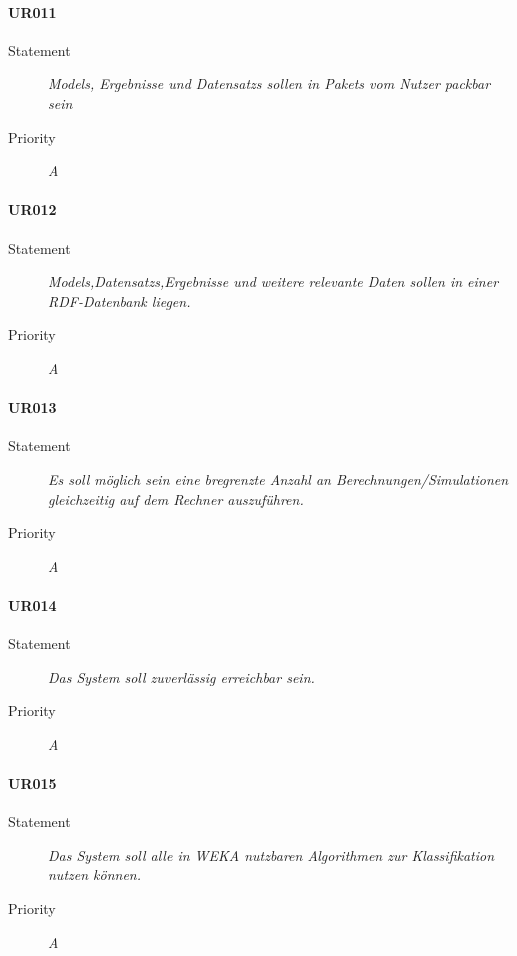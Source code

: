 \paragraph{UR011}
\begin{description}
\item[Statement] \textit{\glspl{Model}, Ergebnisse und \glspl{Datensatz} sollen in \glspl{Paket} vom Nutzer packbar sein}%
\item[Priority] \textit{A}
\end{description}

\paragraph{UR012}
\begin{description}
\item[Statement] \textit{\glspl{Model},\glspl{Datensatz},Ergebnisse und weitere relevante Daten sollen in einer \gls{RDF}-Datenbank liegen.}%
\item[Priority] \textit{A}
\end{description}

\paragraph{UR013}
\begin{description}
\item[Statement] \textit{Es soll möglich sein eine bregrenzte Anzahl an Berechnungen/Simulationen gleichzeitig auf dem Rechner auszuführen.} %
\item[Priority] \textit{A}
\end{description}

\paragraph{UR014}
\begin{description}
\item[Statement] \textit{Das System soll zuverlässig erreichbar sein.}
\item[Priority] \textit{A}
\end{description}

\paragraph{UR015}
\begin{description}
  \item[Statement]
    \textit{Das System soll alle in WEKA nutzbaren Algorithmen zur Klassifikation nutzen können.}
  \item[Priority]
    \textit{A}
\end{description}

